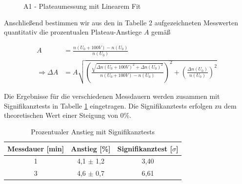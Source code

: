 \documentclass{article}
\begin{document}
\begin{figure}[!b]
    \centering
    \caption{A1 - Plateaumessung mit Linearem Fit}
    \label{fig:A1-Plateau}
\end{figure}

Anschließend bestimmen wir aus den in Tabelle 2 aufgezeichneten Messwerten quantitativ die prozentualen Plateau-Anstiege $A$ gemäß

\begin{equation}
    \begin{split}
        A &= \frac{n(U_0 + 100V) - n(U_0)}{n(U_0)} \\
        \Rightarrow \Delta A &= A \sqrt{\left( \frac{\sqrt{\Delta n(U_0 + 100V)^2 + \Delta n(U_0)^2}}{n(U_0 + 100V) - n(U_0)} \right)^2 + \left( \frac{\Delta n(U_0)}{n(U_0)} \right)^2}
    \end{split}
\end{equation}

Die Ergebnisse für die verschiedenen Messdauern werden zusammen mit Signifikanztests in Tabelle \ref{tab:A1-ProzentualerAnstieg} eingetragen. Die Signifikanztests erfolgen zu dem theoretischen Wert einer Steigung von 0\%. 

\phantom{.}

\begin{table}[!h]
    \centering
    \begin{tabular}{ccc}
        \hline
        \textbf{Messdauer} [min] & \textbf{Anstieg} [\%] & \textbf{Signifikanztest} [$\sigma$]  \\ \hline
         1 & 4,1 $\pm$ 1,2 & 3,40 \\
         3 & 4,6 $\pm$ 0,7 & 6,61 \\\hline
    \end{tabular}%
    \caption{Prozentualer Anstieg mit Signifikanztests}
    \label{tab:A1-ProzentualerAnstieg}
\end{table}
\end{document}
